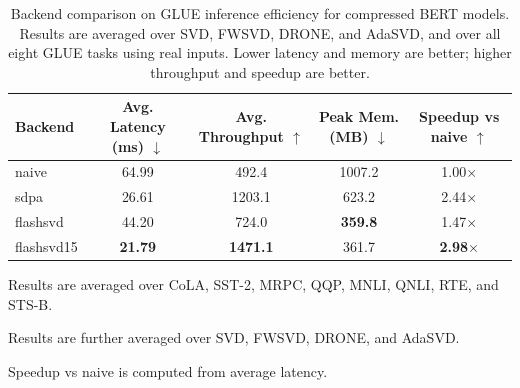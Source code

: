 \begin{table}[t]
\centering
\small
\setlength{\tabcolsep}{4pt}
\renewcommand{\arraystretch}{1.10}
\begin{threeparttable}
\caption{
Backend comparison on GLUE inference efficiency for compressed BERT models.
Results are averaged over SVD, FWSVD, DRONE, and AdaSVD, and over all eight GLUE tasks using real inputs.
Lower latency and memory are better; higher throughput and speedup are better.
}
\label{tab:backend_comparison_glue}
\begin{tabular}{lcccc}
\toprule
Backend & Avg. Latency (ms) $\downarrow$ & Avg. Throughput $\uparrow$ & Peak Mem. (MB) $\downarrow$ & Speedup vs naive $\uparrow$ \\
\midrule
naive      & 64.99 & 492.4  & 1007.2 & 1.00$\times$ \\
sdpa       & 26.61 & 1203.1 & 623.2  & 2.44$\times$ \\
flashsvd   & 44.20 & 724.0  & \textbf{359.8} & 1.47$\times$ \\
flashsvd15 & \textbf{21.79} & \textbf{1471.1} & 361.7 & \textbf{2.98$\times$} \\
\bottomrule
\end{tabular}
\begin{tablenotes}[flushleft]
\footnotesize
\item Results are averaged over CoLA, SST-2, MRPC, QQP, MNLI, QNLI, RTE, and STS-B.
\item Results are further averaged over SVD, FWSVD, DRONE, and AdaSVD.
\item Speedup vs naive is computed from average latency.
\end{tablenotes}
\end{threeparttable}
\end{table}
